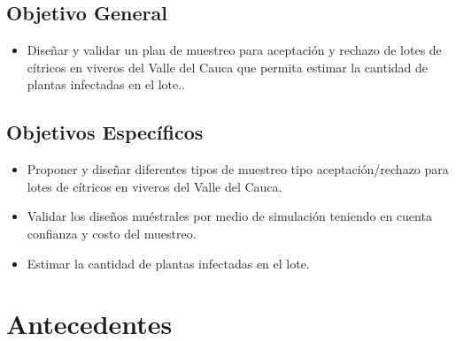 \subsection{Objetivo General}
\begin{itemize}
\item Dise\~{n}ar y validar un plan de muestreo para aceptaci\'{o}n y rechazo de lotes de c\'{i}tricos en viveros del Valle del Cauca que permita estimar la cantidad de plantas infectadas en el lote..
\end{itemize}
\subsection{Objetivos Espec\'{i}ficos}
\begin{itemize}
\item Proponer y dise\~{n}ar diferentes tipos de muestreo tipo aceptaci\'{o}n/rechazo para lotes de c\'{i}tricos en viveros del Valle del Cauca.
\item Validar los dise\~{n}os mu\'{e}strales por medio de simulaci\'{o}n teniendo en cuenta confianza y costo del muestreo.
\item Estimar la cantidad de plantas infectadas en el lote.
\end{itemize}
\section{Antecedentes}